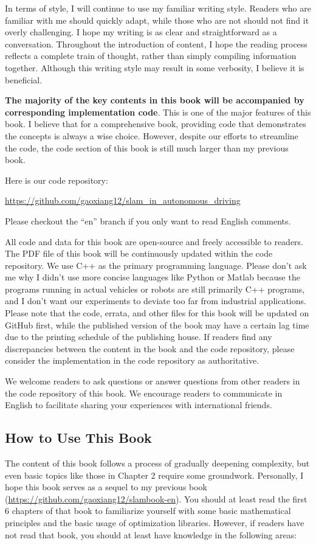 In terms of style, I will continue to use my familiar writing style. Readers who are familiar with me should quickly adapt, while those who are not should not find it overly challenging. I hope my writing is as clear and straightforward as a conversation. Throughout the introduction of content, I hope the reading process reflects a complete train of thought, rather than simply compiling information together. Although this writing style may result in some verbosity, I believe it is beneficial.

\textbf{The majority of the key contents in this book will be accompanied by corresponding implementation code}. This is one of the major features of this book. I believe that for a comprehensive book, providing code that demonstrates the concepts is always a wise choice. However, despite our efforts to streamline the code, the code section of this book is still much larger than my previous book.

Here is our code repository:

\begin{mdframed}
	\centering \small
	\url{https://github.com/gaoxiang12/slam_in_autonomous_driving}
\end{mdframed}

Please checkout the ``en'' branch if you only want to read English comments.

All code and data for this book are open-source and freely accessible to readers. The PDF file of this book will be continuously updated within the code repository. We use C++ as the primary programming language. Please don't ask me why I didn't use more concise languages like Python or Matlab because the programs running in actual vehicles or robots are still primarily C++ programs, and I don't want our experiments to deviate too far from industrial applications. Please note that the code, errata, and other files for this book will be updated on GitHub first, while the published version of the book may have a certain lag time due to the printing schedule of the publishing house. If readers find any discrepancies between the content in the book and the code repository, please consider the implementation in the code repository as authoritative.

We welcome readers to ask questions or answer questions from other readers in the code repository of this book. We encourage readers to communicate in English to facilitate sharing your experiences with international friends.

\subsection*{How to Use This Book}
The content of this book follows a process of gradually deepening complexity, but even basic topics like those in Chapter 2 require some groundwork. Personally, I hope this book serves as a sequel to my previous book \cite{Gao2017} (\url{https://github.com/gaoxiang12/slambook-en}). You should at least read the first 6 chapters of that book to familiarize yourself with some basic mathematical principles and the basic usage of optimization libraries. However, if readers have not read that book, you should at least have knowledge in the following areas:

